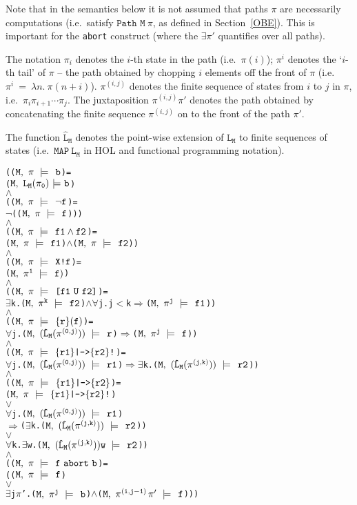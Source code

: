 \documentclass{llncs}
\newcommand{\And}{\(\wedge\)}
\newcommand{\Or}{\(\vee\)}
\newcommand{\Imp}{\(\Rightarrow\)}
\newcommand{\Not}{\(\neg\)}
\newcommand{\Forall}{\(\forall\)}
\newcommand{\Exists}{\(\exists\)}
\newcommand{\pathCat}[2]{#1\hspace*{0.5mm}#2}
\newcommand{\Le}{\(<\)}
\renewcommand{\Pi}{\(\pi\)}
\newcommand{\BSem}[3]{(\(\tt#1,~#2~{\models}~#3\))}
\newcommand{\SSem}[4]{(\(\tt{#1,~#2~\models^{\hspace*{-2.3mm}\raisebox{1mm}{\tt#3}}~#4}\))}
\renewcommand{\c}{{\hspace*{2.5mm}}}
\newcommand{\FSem}[4]{(\(\tt{#1,~#2~\models^{\hspace*{-2.3mm}\raisebox{1mm}{\tt#3}}~#4}\))}
\newcommand{\FBool}[1]{#1}
\newcommand{\fNot}[1]{\neg#1}
\newcommand{\restN}[2]{#1^{#2}}
\newcommand{\pathEl}[2]{#1_{#2}}
\newcommand{\pathSeg}[2]{#1^{#2}}
\newcommand{\lHat}[1]{\hat{\texttt{L}}_{#1}}
\newcommand{\lNoHat}[1]{{\texttt{L}}_{#1}}
\newcommand{\fAnd}[2]{#1 \wedge #2}
\newcommand{\fNext}[1]{\texttt{X!}#1}
\newcommand{\fUntil}[2]{\texttt{[}#1~\texttt{U}~#2\texttt{]}}
\newcommand{\fSuffixImp}[2]{\{#1\}(#2)}
\newcommand{\fStrongImp}[2]{\{#1\}\texttt{|->}\{#2\}\texttt{!}}
\newcommand{\fWeakImp}[2]{\{#1\}\texttt{|->}\{#2\}}
\newcommand{\fAbort}[2]{#1~\texttt{abort}~#2}
\newcommand\Hol{HOL\xspace}
\renewcommand{\t}[1]{\texttt{#1}}
\begin{document}
Note that in the semantics below it is not assumed that paths $\pi$ are necessarily computations
(i.e.~satisfy $\texttt{Path~M}~\pi$, as defined in Section~\ref{OBE}). This is important
for the \t{abort} construct (where the $\exists\pi'$ quantifies over all paths).

The notation $\pi_i$ denotes the $i$-th state in the path (i.e.~$\pi(i)$);
$\pi^i$ denotes the `$i$-th tail' of $\pi$ -- the path obtained
by chopping $i$ elements off the front of $\pi$ (i.e. $\pi^i~=~\lambda n.~\pi(n{+}i)$).
$\pi^{(i,j)}$ denotes the finite sequence of states from $i$ to $j$ in $\pi$,
i.e.~$\pi_i\pi_{i{+}1}\cdots\pi_j$. The juxtaposition
$\pi^{(i,j)}\pi'$ denotes the path obtained by concatenating the finite sequence
$\pi^{(i,j)}$ on to the front of the path $\pi'$. 

The function $\hat{\t{L}}_{\t{M}}$ denotes the point-wise extension of
$\t{L}_{\t{M}}$ to finite sequences of states
(i.e.~$\texttt{MAP}~\t{L}_{\t{M}}$ in \Hol and functional programming notation).



{\begin{alltt}
    ({\FSem{M}{{\pi}}{{\c}}{\FBool{b}}} = 
     {\BSem{M}{\lNoHat{M}(\pathEl{{\pi}}{0})}{b}}
    {\And}
    ({\FSem{M}{{\pi}}{{\c}}{\fNot{f}}} =
     {\Not}({\FSem{M}{{\pi}}{\c}{f}})) 
    {\And}
    ({\FSem{M}{{\pi}}{{\c}}{\fAnd{f1}{f2}}} =
     {\FSem{M}{\pi}{{\c}}{f1}} {\And} {\FSem{M}{\pi}{{\c}}{f2}})
    {\And}
    ({\FSem{M}{{\pi}}{{\c}}{\fNext{f}}} =
     {\FSem{M}{\restN{{\pi}}{1}}{{\c}}{f)}}
    {\And}
    ({\FSem{M}{{\pi}}{{\c}}{\fUntil{f1}{f2}}} = 
      {\Exists}k. {\FSem{M}{\restN{{\pi}}{k}}{\c}{f2}} {\And} {\Forall}j. j \Le k \Imp {\FSem{M}{\restN{{\pi}}{j}}{{\c}}{f1}})
    {\And}
    ({\FSem{M}{{\pi}}{{\c}}{\fSuffixImp{r}{f}}} = 
      {\Forall}j. \SSem{M}{(\lHat{M} (\pathSeg{\pi}{(0,j)}))}{\c}{r} {\Imp} {\FSem{M}{\restN{{\pi}}{j}}{{\c}}{f}})
    {\And}
    ({\FSem{M}{{\pi}}{{\c}}{\fStrongImp{r1}{r2}}} = 
      {\Forall}j. \SSem{M}{(\lHat{M} (\pathSeg{\pi}{(0,j)}))}{\c}{r1} {\Imp} {\Exists}k. \SSem{M}{(\lHat{M} (\pathSeg{\pi}{(j,k)}))}{\c}{r2})
    {\And}
    ({\FSem{M}{{\pi}}{{\c}}{\fWeakImp{r1}{r2}}} = 
     {\FSem{M}{{\pi}}{{\c}}{\fStrongImp{r1}{r2}}}
      \Or
      {\Forall}j. \SSem{M}{(\lHat{M} (\pathSeg{\pi}{(0,j)}))}{\c}{r1} 
          \Imp ({\Exists}k. \SSem{M}{(\lHat{M} (\pathSeg{\pi}{(j,k)}))}{\c}{r2})
             \Or
             {\Forall}k. {\Exists}w. \SSem{M}{(\lHat{M} (\pathSeg{\pi}{(j,k)}))w}{\c}{r2})
    {\And}
    ({\FSem{M}{{\pi}}{{\c}}{\fAbort{f}{b}}} =
      ({\FSem{M}{\pi}{{\c}}{f }}
       {\Or}
       {\Exists}j {\Pi}'. {\FSem{M}{\restN{{\pi}}{j}}{\c}{{\FBool{b}}}} {\And} {\FSem{M}{\pathCat{\pathSeg{\pi}{(i,j-1)}}{{\pi}'}}{{\c}}{f}}))
\end{alltt}}
\end{document}
